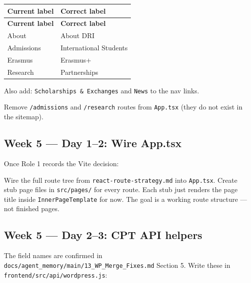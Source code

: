 \documentclass[11pt,a4paper]{article}
\begin{document}
\begin{longtable}{@{}p{7.2cm}p{7.2cm}@{}}
\rowcolor{uvtLightBlue}
\textbf{Current label} & \textbf{Correct label} \\
\midrule
\endfirsthead
\rowcolor{uvtLightBlue}
\textbf{Current label} & \textbf{Correct label} \\
\midrule
\endhead
About & About DRI \\
Admissions & International Students \\
Erasmus & Erasmus+ \\
Research & Partnerships \\
\end{longtable}

Also add: \nolinkurl{Scholarships & Exchanges} and \nolinkurl{News} to the nav links.

Remove \nolinkurl{/admissions} and \nolinkurl{/research} routes from \nolinkurl{App.tsx} (they do not exist in the sitemap).

\subsection{Week 5 — Day 1–2: Wire App.tsx}

Once Role 1 records the Vite decision:

Wire the full route tree from \nolinkurl{react-route-strategy.md} into \nolinkurl{App.tsx}. Create stub page files in \nolinkurl{src/pages/} for every route. Each stub just renders the page title inside \nolinkurl{InnerPageTemplate} for now. The goal is a working route structure — not finished pages.

\subsection{Week 5 — Day 2–3: CPT API helpers}

The field names are confirmed in \nolinkurl{docs/agent_memory/main/13_WP_Merge_Fixes.md} Section 5. Write these in \nolinkurl{frontend/src/api/wordpress.js}:
\end{document}
